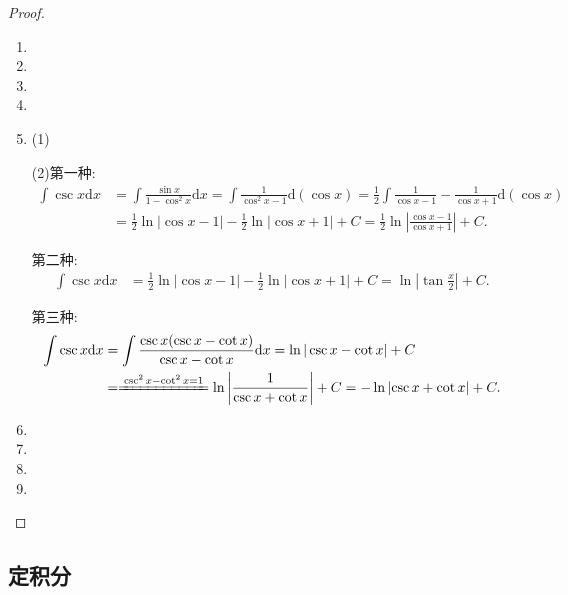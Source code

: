 \documentclass[../../main.tex]{subfiles}
\begin{document}
\begin{proof}
\begin{enumerate}
\item 

\item 

\item 

\item 

\item (1)

(2)第一种:
\begin{align*}
\int \csc x \mathrm{d}x &= \int \frac{\sin x}{1 - \cos^2 x} \mathrm{d}x = \int \frac{1}{\cos^2 x - 1} \mathrm{d}(\cos x) = \frac{1}{2}
\int \frac{1}{\cos x - 1} - \frac{1}{\cos x + 1} \mathrm{d}(\cos x) \\
&= \frac{1}{2}\ln|\cos x - 1| - \frac{1}{2}\ln|\cos x + 1| + C=\frac{1}{2}\ln \left| \frac{\cos x-1}{\cos x+1} \right|+C.
\end{align*}

第二种:
\begin{align*}
\int \csc x \mathrm{d}x &= \frac{1}{2}\ln|\cos x - 1| - \frac{1}{2}\ln|\cos x + 1| + C = \ln|\tan \frac{x}{2}| + C.
\end{align*}

第三种:
\begin{align*}
\int \csc x \mathrm{d}x &= \int \frac{\csc x(\csc x - \cot x)}{\csc x - \cot x} \mathrm{d}x = \ln|\csc x - \cot x| + C\\
&=\xlongequal{\csc ^2x-\cot ^2x=1}\ln \left| \frac{1}{\csc x+\cot x} \right|+C
=-\ln \left| \csc x+\cot x \right|+C.
\end{align*}

\item 

\item 

\item 

\item 
\end{enumerate}
\end{proof}


\subsection{定积分}
\end{document}
